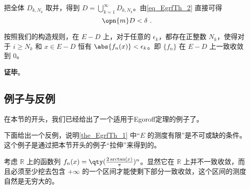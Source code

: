 把全体 $D_{k, N_k}$ 取并，得到 $D=\bigcup_{k=1}^\infty D_{k, N_k}$。由\autoref{eq_EgrfTh_2} 直接可得
\begin{equation}
\opn{m}D<\delta~.
\end{equation}

按照我们的构造规则，在 $E-D$ 上，对于任意的 $\epsilon_k$，都存在正整数 $N_k$，使得对于 $i\geq N_k$ 和 $x\in E-D$ 恒有 $\abs{f_n(x)}<\epsilon_k$。即 $\{f_n\}$ 在 $E-D$ 上一致收敛到 $0$。

\textbf{证毕}。


\subsection{例子与反例}

在本节的开头，我们已经给出了一个适用于Egoroff定理的例子了。

下面给出一个反例，说明\autoref{the_EgrfTh_1} 中“$E$ 的测度有限”是不可或缺的条件。这个例子是通过把本节开头的例子“拉伸”来得到的。


\begin{example}{}

考虑 $\mathbb{R}$ 上的函数列 $f_n(x)=\qty(\frac{2\arctan(x)}{\pi})^n$。显然它在 $\mathbb{R}$ 上并不一致收敛，而且必须至少挖去包含 $+\infty$ 的一个区间才能使剩下部分一致收敛，这个区间的测度自然是无穷大的。

\end{example}















